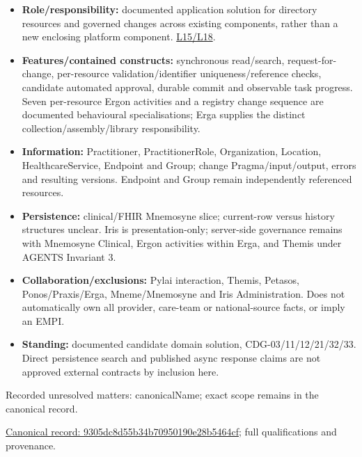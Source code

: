\begin{itemize}


\item \textbf{Role/responsibility:} documented application solution for directory resources
  and governed changes across existing components, rather than a new enclosing
  platform component. \href{\detokenize{../../../../../docs/markdown/05-information-systems-architecture/sources.md#l15}}{L15/L18}.

\item \textbf{Features/contained constructs:} synchronous read/search, request-for-change,
  per-resource validation/identifier uniqueness/reference checks, candidate automated
  approval, durable commit and observable task progress. Seven per-resource Ergon
  activities and a registry change sequence are documented behavioural specialisations;
  Erga supplies the distinct collection/assembly/library responsibility.

\item \textbf{Information:} Practitioner, PractitionerRole, Organization, Location,
  HealthcareService, Endpoint and Group; change Pragma/input/output, errors and
  resulting versions. Endpoint and Group remain independently referenced resources.

\item \textbf{Persistence:} clinical/FHIR Mnemosyne slice; current-row versus history
  structures unclear. Iris is presentation-only; server-side governance remains
  with Mnemosyne Clinical, Ergon activities within Erga, and Themis under
  AGENTS Invariant 3.

\item \textbf{Collaboration/exclusions:} Pylai interaction, Themis, Petasos, Ponos/Praxis/Erga,
  Mneme/Mnemosyne and Iris Administration. Does not automatically own all provider,
  care-team or national-source facts, or imply an EMPI.

\item \textbf{Standing:} documented candidate domain solution, CDG-03/11/12/21/32/33.
  Direct persistence search and published async response claims are not approved
  external contracts by inclusion here.

\end{itemize}

{\small Recorded unresolved matters: canonicalName; exact scope remains in the canonical record.}\par
{\footnotesize \href{../../../../continuum/application/application-collaboration/9305dc8d55b34b70950190e28b5464cf.md}{Canonical record: 9305dc8d55b34b70950190e28b5464cf}; full qualifications and provenance.}\par
